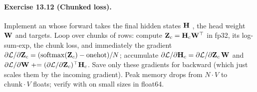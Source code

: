 \paragraph{Exercise 13.12 (Chunked loss).}
Implement an  whose forward takes the final hidden states $\mathbf{H}$
, the head weight $\mathbf{W}$  and targets. Loop over chunks of rows: compute
$\mathbf{Z}_c=\mathbf{H}_c\mathbf{W}^\top$ in fp32, its log-sum-exp, the chunk loss, and immediately the
gradient $\partial\mathcal L/\partial\mathbf{Z}_c=(\operatorname{softmax}(\mathbf{Z}_c)-\text{onehot})/N$; accumulate
$\partial\mathcal L/\partial\mathbf{H}_c=\partial\mathcal L/\partial\mathbf{Z}_c\,\mathbf{W}$ and
$\partial\mathcal L/\partial\mathbf{W}\mathrel{+}=(\partial\mathcal L/\partial\mathbf{Z}_c)^\top\mathbf{H}_c$.
Save only these gradients for backward (which just scales them by the incoming gradient). Peak
memory drops from $N\cdot V$ to $\text{chunk}\cdot V$ floats; verify with
 on small sizes in float64.
